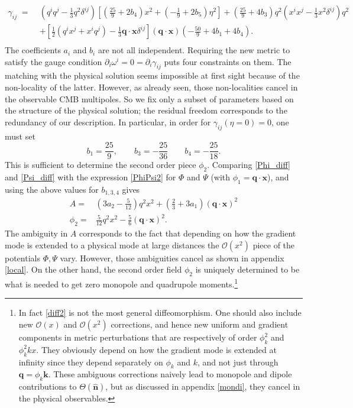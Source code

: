 \documentclass[12pt]{article}
\numberwithin{equation}{section}
\def\bsb{\boldsymbol}
\def\be{\begin{equation}}
\def\ee{\end{equation}}
\def\d{\partial}
\def\n{\bsb{\hat n}}
\def\O{\mathcal{O}}
\def\x{{\bsb x}}
\def\q{{\bsb q}}
\def\k{{\bsb k}}
\begin{document}
{%
\be\label{gamma_diff}
\begin{split}
\gamma_{ij}\;=\;& (q^i q^j -\frac{1}{3}q^2 \delta^{ij})[(\frac{25}{9}+2b_4)x^2 +(-\frac{1}{9}+2b_5)\eta^2]
+(\frac{25}{9}+4b_3) q^2 (x^i x^j -\frac{1}{3} x^2 \delta^{ij})q^2 \\[10pt]
&+[\frac{1}{2}(q^ix^j+x^iq^j)-\frac{1}{3}\bsb q\cdot \bsb x \delta^{ij}](\bsb q\cdot \bsb x)(-\frac{50}{9}+4b_1+4b_4).\\[10pt]
\end{split}
\ee
The coefficients $a_i$ and $b_i$ are not all independent. Requiring the new metric to satisfy the gauge condition $\d_i\omega^i=0=\d_i\gamma_{ij}$ puts four constraints on them. The matching with the physical solution seems impossible at first sight because of the non-locality of the latter. However, as already seen, those non-localities cancel in the observable CMB multipoles. So we fix only a subset of parameters based on the structure of the physical solution; the residual freedom corresponds to the redundancy of our description. In particular, in order for $\gamma_{ij}(\eta=0)=0$, one must set
\be
\label{bs}
b_1 = \frac{25}{9},\qquad b_3 = -\frac{25}{36}\qquad b_4=-\frac{25}{18}.
\ee
This is sufficient to determine the second order piece $\phi_2$. Comparing \eqref{Phi_diff} and \eqref{Psi_diff} with the expression \eqref{PhiPsi2} for $\Phi$ and $\Psi$ (with $\phi_1 =\q\cdot\x$), and using the above values for $b_{1,3,4}$ gives
\be
\begin{split}
A=&\left(3 a_2-\frac{5}{12}\right) q^2 x^2+(\frac{2}{3}+3a_1)(\bsb q\cdot \bsb x)^2\\[10pt]
\phi_2 =&\frac{5}{12}q^2x^2 -\frac{5}{6} (\bsb q\cdot \bsb x)^2 .
\end{split}
\ee
The ambiguity in $A$ corresponds to the fact that depending on how the gradient mode is extended to a physical mode at large distances the $\O(x^2)$ piece of the potentials $\Phi,\Psi$ vary. However, those ambiguities cancel as shown in appendix \ref{local}. On the other hand, the second order field $\phi_2$ is uniquely determined to be what is needed to get zero monopole and quadrupole moments.\footnote{In fact \eqref{diff2} is not the most general diffeomorphism. One should also include new $\O(x)$ and $\O(x^2)$ corrections, and hence new uniform and gradient components in metric perturbations that are respectively of order $\phi_k^2$ and $\phi_k^2 k x$. They obviously depend on how the gradient mode is extended at infinity since they depend separately on $\phi_k$ and $k$, and not just through $\q=\phi_k \k$. These ambiguous corrections naively lead to monopole and dipole contributions to $\Theta(\n)$, but as discussed in appendix \ref{mondi}, they cancel in the physical observables.}

}
\end{document}
